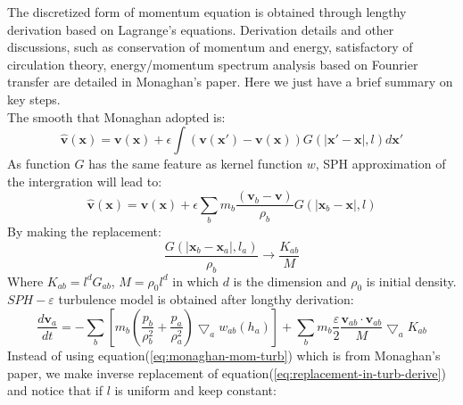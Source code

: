 \documentclass[10pt,a4paper]{article}
\begin{document}
The discretized form of momentum equation is obtained through lengthy derivation based on Lagrange’s equations. Derivation details and other discussions, such as conservation of momentum and energy, satisfactory of circulation theory, energy/momentum spectrum analysis based on Founrier transfer are detailed in Monaghan's paper\cite{monaghan2011turbulence}. Here we just have a brief summary on key steps.\\
The smooth that Monaghan adopted is:
\begin{equation}
\widehat{\textbf{v}}(\textbf{x})=\textbf{v}(\textbf{x})+ \epsilon \int (\textbf{v}(\textbf{x} \prime)-\textbf{v}(\textbf{x}))G(\vert \textbf{x} \prime - \textbf{x} \vert, l) d\textbf{x} \prime
\end{equation}
As function $G$ has the same feature as kernel function $w$, SPH approximation of the intergration will lead to:
\begin{equation} \label{eq:SPH-epsilon-filtering}
\widehat{\textbf{v}}(\textbf{x})=\textbf{v}(\textbf{x})+\epsilon \sum_b m_b \dfrac{(\textbf{v}_b -\textbf{v})}{\rho _b} G(\vert \textbf{x} _b - \textbf{x} \vert, l)
\end{equation}
By making the replacement:
\begin{equation}
\label{eq:replacement-in-turb-derive}
\dfrac{G(\vert \textbf{x} _b - \textbf{x} _a \vert, l_a)}{\rho _b} \rightarrow \dfrac{K_{ab}}{M}
\end{equation}
Where $K_{ab} = l^d G_{ab}$, $M = \rho_0 l^d$ in which $d$ is the dimension and $\rho_0$ is initial density. $SPH-\varepsilon$ turbulence model is obtained after longthy derivation:
\begin{equation}
\label{eq:monaghan-mom-turb}
\dfrac{d \textbf{v}_a}{dt} = -\sum_b [m_b (\dfrac{p_b}{\rho_b^2} + \dfrac{p_a}{\rho_a^2}) \bigtriangledown_aw_{a b}(h_a)] + \sum_b m_b \dfrac{\varepsilon}{2} \dfrac{\textbf{v}_{ab} \cdot \textbf{v}_{ab}}{M} \bigtriangledown_a K_{ab}
\end{equation}
Instead of using equation(\ref{eq:monaghan-mom-turb}) which is from Monaghan's paper, we make inverse replacement of equation(\ref{eq:replacement-in-turb-derive}) and notice that if $l$ is uniform and keep constant: 
\end{document}
